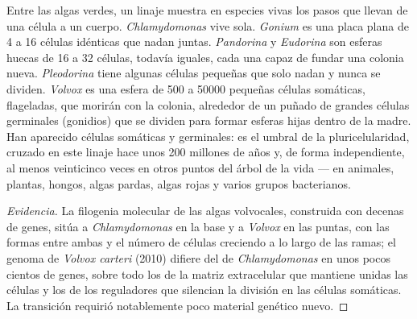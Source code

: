 \begin{proposition}\label{prop:b2:unicellular-diversity:volvox}
Entre las algas verdes, un linaje muestra en especies vivas los pasos que
llevan de una célula a un cuerpo. \emph{Chlamydomonas} vive sola.
\emph{Gonium} es una placa plana de 4 a 16 células idénticas que nadan
juntas. \emph{Pandorina} y \emph{Eudorina} son esferas huecas de 16 a 32
células, todavía iguales, cada una capaz de fundar una colonia nueva.
\emph{Pleodorina} tiene algunas células pequeñas que solo nadan y nunca
se dividen. \emph{Volvox} es una esfera de \num{500} a \num{50000}
pequeñas células somáticas, flageladas, que morirán con la colonia,
alrededor de un puñado de grandes células germinales (gonidios) que se
dividen para formar esferas hijas dentro de la madre. Han aparecido
células somáticas y germinales: es el umbral de la pluricelularidad,
cruzado en este linaje hace unos \num{200} millones de años y, de forma
independiente, al menos veinticinco veces en otros puntos del árbol de
la vida --- en animales, plantas, hongos, algas pardas, algas rojas y
varios grupos bacterianos.
\end{proposition}
\begin{proof}[Evidencia]
La filogenia molecular de las algas volvocales, construida con decenas de
genes, sitúa a \emph{Chlamydomonas} en la base y a \emph{Volvox} en las
puntas, con las formas  entre ambas y el número de células
creciendo a lo largo de las ramas; el genoma de \emph{Volvox carteri}
(2010) difiere del de \emph{Chlamydomonas} en unos pocos cientos de
genes, sobre todo los de la matriz extracelular que mantiene unidas las
células y los de los reguladores que silencian la división en las
células somáticas. La transición requirió notablemente poco material
genético nuevo.
\end{proof}

